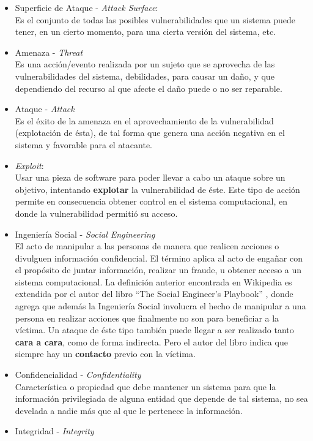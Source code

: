 \begin{itemize}
    \item Superficie de Ataque - \textit{Attack Surface}:
        \\Es el conjunto de todas las posibles vulnerabilidades que un sistema puede tener, en un cierto momento, para una cierta versión del sistema, etc.
    \item Amenaza - \textit{Threat}
        \\Es una acción/evento realizada por un sujeto que se aprovecha de las vulnerabilidades del sistema, debilidades, para causar un daño, y que dependiendo del recurso al que afecte el daño puede o no ser reparable.
    \item Ataque - \textit{Attack}
        \\Es el éxito de la amenaza en el aprovechamiento de la vulnerabilidad (explotación de ésta), de tal forma que genera una acción negativa en el sistema y favorable para el atacante.
    \item \textit{Exploit}:
        \\Usar una pieza de software para poder llevar a cabo un ataque sobre un objetivo, intentando \textbf{explotar} la vulnerabilidad de éste. Este tipo de acción permite en consecuencia obtener control en el sistema computacional, en donde la vulnerabilidad permitió su acceso.
    \item Ingeniería Social - \textit{Social Engineering}
        \\El acto de manipular a las personas de manera que realicen acciones o divulguen información confidencial. El término aplica al acto de engañar con el propósito de juntar información, realizar un fraude, u obtener acceso a un sistema computacional. La definición anterior encontrada en Wikipedia es extendida por el autor del libro ``The Social Engineer's Playbook'' \cite{socEngineeering}, donde agrega que además la Ingeniería Social involucra el hecho de manipular a una persona en realizar acciones que finalmente no son para beneficiar a la víctima. Un ataque de éste tipo también puede llegar a ser realizado tanto \textbf{cara a cara}, como de forma indirecta. Pero el autor del libro indica que siempre hay un \textbf{contacto} previo con la víctima.
    \item Confidencialidad - \textit{Confidentiality} 
        \\Característica o propiedad que debe mantener un sistema para que la información privilegiada de alguna entidad que depende de tal sistema, no sea develada a nadie más que al que le pertenece la información.
    \item Integridad - \textit{Integrity}

\end{itemize}
